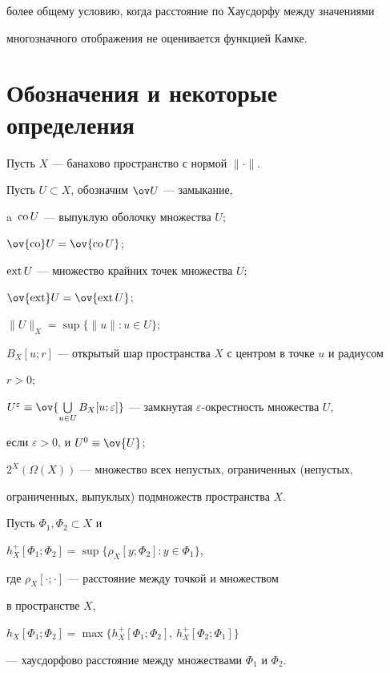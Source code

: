 более общему условию, когда расстояние по Хаусдорфу между значениями


многозначного отображения не оценивается функцией Камке.





\section*{Обозначения и некоторые определения}





Пусть $X$ --- банахово пространство с нормой $\|\cdot\|$.


Пусть $U\subset X$, обозначим $\ov U$ --- замыкание,


a~$\operatorname{co} U$ --- выпуклую оболочку множества $U$;


$\ov{\co} U= \ov{\co U}$;


$\operatorname{ext} U$ --- множество крайних точек множества $U$;


$\ov{\ext}U=\ov{\ext U}$;


$\|U\|_X=\sup\{\|u\|:{u\in U}\}$;


$B_X[u;r]$ --- открытый шар пространства $X$ с центром в точке $u$ и радиусом


$r>0$;


$U^\varepsilon\equiv\ov{\bigcup\limits_{u\in U}


B_X[u;\varepsilon]}$ --- замкнутая $\varepsilon$-окрестность множества $U$,


если $\varepsilon>0$, и $U^0\equiv\ov{U}$;


$2^X(\Omega(X))$ --- множество всех непустых, ограниченных (непустых,


ограниченных, выпуклых) подмножеств пространства $X$.





Пусть $\Phi_1,\Phi_2 \subset X$ и


$h^+_X[\Phi_1;\Phi_2]=\sup\{\rho_X [y;\Phi_2]:y\in\Phi_1\}$,


где $\rho_X[\cdot;\cdot]$ --- расстояние между точкой и множеством


в пространстве $X$,


$h_X[\Phi_1;\Phi_2]=\max\{h^+_X[\Phi_1;\Phi_2],\,


h^+_X[\Phi_2;\Phi_1]\}$


--- хаусдорфово расстояние между множествами $\Phi_1$ и $\Phi_2$.





